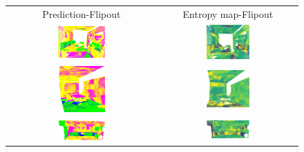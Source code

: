     \begin{figure}[h!]
        \centering
        \begin{tabular}{cc}
            Prediction-Flipout & Entropy map-Flipout \\
            \includegraphics[width=0.33\textwidth, height=0.18\textheight]{images/seg_output/s3dis_DE/office_3.png}& 
            \includegraphics[width=0.33\textwidth, height=0.18\textheight]{images/seg_output/flipout/ent_fout_s3dis_3.png}\\

            \includegraphics[width=0.33\textwidth, height=0.18\textheight]{images/seg_output/s3dis_DE/ocroom_1.png}& 
            \includegraphics[width=0.33\textwidth, height=0.18\textheight]{images/seg_output/flipout/ent_fout_s3dis_1.png}\\

            \includegraphics[width=0.33\textwidth, height=0.18\textheight]{images/seg_output/s3dis_DE/opantry_1.png}& 
            \includegraphics[width=0.33\textwidth, height=0.18\textheight]{images/seg_output/flipout/ent_fout_s3dis_2.png}\\


\end{tabular}
\end{figure}
